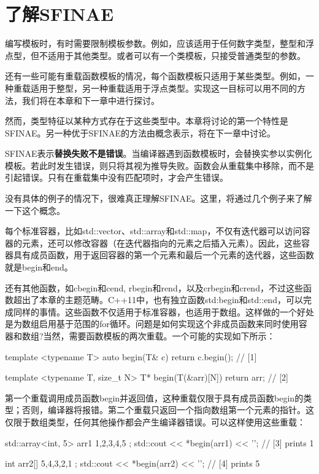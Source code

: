 \section{了解SFINAE}
编写模板时，有时需要限制模板参数。例如，应该适用于任何数字类型，整型和浮点型，但不适用于其他类型。或者可以有一个类模板，只接受普通类型的参数。

还有一些可能有重载函数模板的情况，每个函数模板只适用于某些类型。例如，一种重载适用于整型，另一种重载适用于浮点类型。实现这一目标可以用不同的方法，我们将在本章和下一章中进行探讨。

然而，类型特征以某种方式存在于这些类型中。本章将讨论的第一个特性是SFINAE。另一种优于SFINAE的方法由概念表示，将在下一章中讨论。

SFINAE表示\textbf{替换失败不是错误}。当编译器遇到函数模板时，会替换实参以实例化模板。若此时发生错误，则只将其视为推导失败。函数会从重载集中移除，而不是引起错误。只有在重载集中没有匹配项时，才会产生错误。

没有具体的例子的情况下，很难真正理解SFINAE。这里，将通过几个例子来了解一下这个概念。

每个标准容器，比如std::vector、std::array和std::map，不仅有迭代器可以访问容器的元素，还可以修改容器（在迭代器指向的元素之后插入元素）。因此，这些容器具有成员函数，用于返回容器的第一个元素和最后一个元素的迭代器，这些函数就是begin和end。

还有其他函数，如cbegin和cend, rbegin和rend，以及crbegin和crend，不过这些函数超出了本章的主题范畴。C++11中，也有独立函数std:begin和std::end，可以完成同样的事情。这些函数不仅适用于标准容器，也适用于数组。这样做的一个好处是为数组启用基于范围的for循环。问题是如何实现这个非成员函数来同时使用容器和数组?当然，需要函数模板的两次重载。一个可能的实现如下所示：

\begin{cpp}
template <typename T>
auto begin(T& c) { return c.begin(); } // [1]

template <typename T, size_t N>
T* begin(T(&arr)[N]) {return arr; } // [2]
\end{cpp}

第一个重载调用成员函数begin并返回值，这种重载仅限于具有成员函数begin的类型；否则，编译器将报错。第二个重载只返回一个指向数组第一个元素的指针。这仅限于数组类型，任何其他操作都会产生编译器错误。可以这样使用这些重载：

\begin{cpp}
std::array<int, 5> arr1{ 1,2,3,4,5 };
std::cout << *begin(arr1) << '\n'; // [3] prints 1

int arr2[]{ 5,4,3,2,1 };
std::cout << *begin(arr2) << '\n'; // [4] prints 5
\end{cpp}

